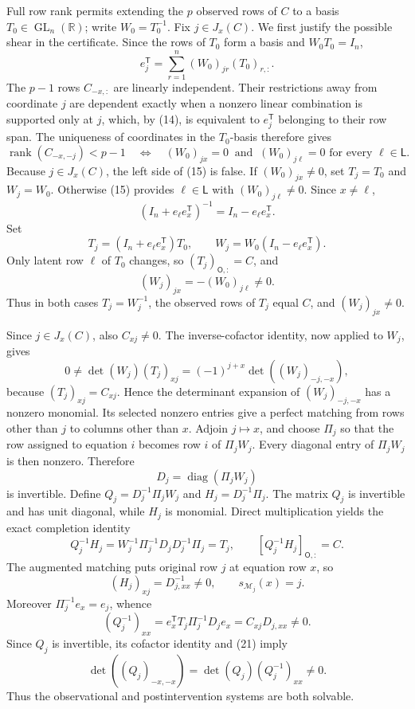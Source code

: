 Full row rank permits extending the \(p\) observed rows of \(C\) to a basis \(T_0\in\operatorname{GL}_n(\mathbb R)\); write \(W_0=T_0^{-1}\). Fix \(j\in J_x(C)\). We first justify the possible shear in the certificate. Since the rows of \(T_0\) form a basis and \(W_0T_0=I_n\),
\[
e_j^{\mathsf T}=\sum_{r=1}^n(W_0)_{jr}(T_0)_{r,:}. \tag{14}
\]
The \(p-1\) rows \(C_{-x,:}\) are linearly independent. Their restrictions away from coordinate \(j\) are dependent exactly when a nonzero linear combination is supported only at \(j\), which, by (14), is equivalent to \(e_j^{\mathsf T}\) belonging to their row span. The uniqueness of coordinates in the \(T_0\)-basis therefore gives
\[
\operatorname{rank}(C_{-x,-j})<p-1
\quad\Longleftrightarrow\quad
(W_0)_{jx}=0\ \text{ and }\ (W_0)_{j\ell}=0\text{ for every }\ell\in\mathsf L. \tag{15}
\]
Because \(j\in J_x(C)\), the left side of (15) is false. If \((W_0)_{jx}\ne0\), set \(T_j=T_0\) and \(W_j=W_0\). Otherwise (15) provides \(\ell\in\mathsf L\) with \((W_0)_{j\ell}\ne0\). Since \(x\ne\ell\),
\[
(I_n+e_\ell e_x^{\mathsf T})^{-1}=I_n-e_\ell e_x^{\mathsf T}.
\]
Set
\[
T_j=(I_n+e_\ell e_x^{\mathsf T})T_0,
\qquad
W_j=W_0(I_n-e_\ell e_x^{\mathsf T}). \tag{16}
\]
Only latent row \(\ell\) of \(T_0\) changes, so \((T_j)_{\mathsf O,:}=C\), and
\[
(W_j)_{jx}=-(W_0)_{j\ell}\ne0. \tag{17}
\]
Thus in both cases \(T_j=W_j^{-1}\), the observed rows of \(T_j\) equal \(C\), and \((W_j)_{jx}\ne0\).

Since \(j\in J_x(C)\), also \(C_{xj}\ne0\). The inverse-cofactor identity, now applied to \(W_j\), gives
\[
0\ne \det(W_j)(T_j)_{xj}
=(-1)^{j+x}\det((W_j)_{-j,-x}), \tag{18}
\]
because \((T_j)_{xj}=C_{xj}\). Hence the determinant expansion of \((W_j)_{-j,-x}\) has a nonzero monomial. Its selected nonzero entries give a perfect matching from rows other than \(j\) to columns other than \(x\). Adjoin \(j\mapsto x\), and choose \(\Pi_j\) so that the row assigned to equation \(i\) becomes row \(i\) of \(\Pi_jW_j\). Every diagonal entry of \(\Pi_jW_j\) is then nonzero. Therefore
\[
D_j=\operatorname{diag}(\Pi_jW_j)
\]
is invertible. Define \(Q_j=D_j^{-1}\Pi_jW_j\) and \(H_j=D_j^{-1}\Pi_j\). The matrix \(Q_j\) is invertible and has unit diagonal, while \(H_j\) is monomial. Direct multiplication yields the exact completion identity
\[
Q_j^{-1}H_j
=W_j^{-1}\Pi_j^{-1}D_jD_j^{-1}\Pi_j
=T_j,
\qquad
[Q_j^{-1}H_j]_{\mathsf O,:}=C. \tag{19}
\]
The augmented matching puts original row \(j\) at equation row \(x\), so
\[
(H_j)_{xj}=D_{j,xx}^{-1}\ne0,
\qquad s_{\mathcal M_j}(x)=j. \tag{20}
\]
Moreover \(\Pi_j^{-1}e_x=e_j\), whence
\[
(Q_j^{-1})_{xx}
=e_x^{\mathsf T}T_j\Pi_j^{-1}D_je_x
=C_{xj}D_{j,xx}\ne0. \tag{21}
\]
Since \(Q_j\) is invertible, its cofactor identity and (21) imply
\[
\det((Q_j)_{-x,-x})=\det(Q_j)(Q_j^{-1})_{xx}\ne0. \tag{22}
\]
Thus the observational and postintervention systems are both solvable.

